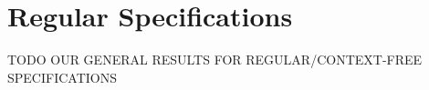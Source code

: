 \section{Regular Specifications}
\label{sec:regular}

TODO OUR GENERAL RESULTS FOR REGULAR/CONTEXT-FREE SPECIFICATIONS
